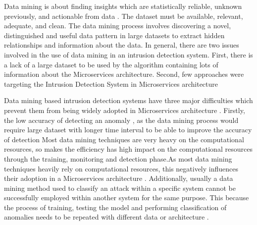 \documentclass[sigconf]{acmart}
\begin{document}
Data mining is about finding insights which are statistically reliable, unknown previously, and actionable from data \cite{phua2010comprehensive}. The dataset must be available, relevant, adequate, and clean. The data mining process involves discovering a novel, distinguished and useful data pattern in large datasets to extract hidden relationships and information about the data. In general, there are two issues involved in the use of data mining in an intrusion detection system. First, there is a lack of a large dataset to be used by the algorithm containing lots of information about the Microservices architecture. Second, few approaches were targeting the Intrusion Detection System in Microservices architecture \cite{phua2010comprehensive}

Data mining based intrusion detection systems have three major difficulties which prevent them from being widely adopted in Microservices architecture \cite{Patcha:2007hja}. Firstly, the low accuracy of detecting an anomaly \cite{gupta2016network,Patcha:2007hja}, as the data mining process would require large dataset with longer time interval to be able to improve the accuracy of detection 
Most data mining techniques are very heavy on the computational resources, so makes the efficiency has high impact on the computational resources through the training, monitoring and detection phase.As most data mining techniques heavily rely on computational resources, this negatively influences their adoption in a Microservices architecture  \cite{Patcha:2007hja}. Additionally, usually a data mining method used to classify an attack within a specific system cannot be successfully employed within another system for the same purpose. This because the process of training, testing the model and performing classification of anomalies needs to be repeated with different data or architecture \cite{Buczak:2016kt}.  
\end{document}
